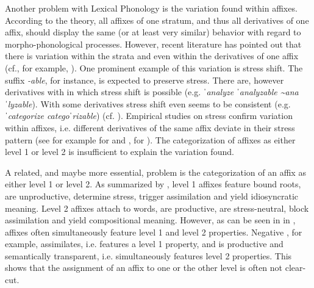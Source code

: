 Another problem with Lexical Phonology is the variation found within affixes. According to the theory, all affixes of one stratum, and thus all derivatives of one affix, should display the same (or at least very similar) behavior with regard to morpho-phonological processes. However, recent literature has pointed out that there is variation within the strata and even within the derivatives of one affix (cf., for example, \citealt{Raffelsiefen.1999,Bauer.2013, Plag.2014, BermudezOtero.2017}).  One prominent example of this variation is stress shift. The suffix \textit{-able}, for instance, is expected to preserve stress. There are, however derivatives with  in which stress shift is possible (e.g. \textit{ˈanalyze \textendash ˈanalyzable \textasciitilde anaˈlyzable}). With some derivatives stress shift even seems to  be consistent (e.g. \textit{ˈcategorize \textendash categoˈrizable}) (cf. \citealt[213 f.]{Plag.2014}). Empirical studies on stress confirm variation within affixes, i.e. different derivatives of the same affix deviate in their stress pattern (see for example \citealt{Collie.2008} for  and , \citealt{Sanz.2017} for ). The categorization of affixes as either level 1 or level 2 is insufficient to explain the variation found. 

A related, and maybe more essential, problem is the categorization of an affix as either level 1 or level 2. As summarized by \citet[134]{Raffelsiefen.1999}, level 1 affixes feature bound roots, are unproductive, determine stress, trigger assimilation and yield idiosyncratic meaning. Level 2 affixes attach to words, are productive, are stress-neutral, block assimilation and yield compositional meaning. However, as can be seen in  in , affixes often simultaneously feature level 1 and level 2 properties. Negative , for example, assimilates, i.e. features a level 1 property, and is productive and semantically transparent, i.e. simultaneously features level 2 properties. This shows that the assignment of an affix to one or the other level is often not clear-cut. 

